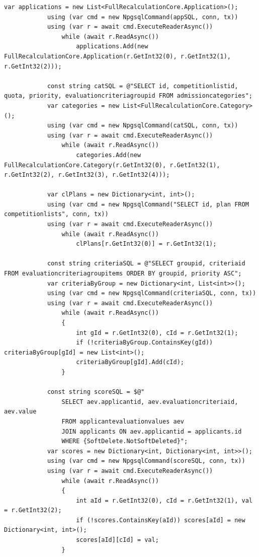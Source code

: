 \begin{lstlisting}[style=csharpstyle]
            var applications = new List<FullRecalculationCore.Application>();
            using (var cmd = new NpgsqlCommand(appSQL, conn, tx))
            using (var r = await cmd.ExecuteReaderAsync())
                while (await r.ReadAsync())
                    applications.Add(new FullRecalculationCore.Application(r.GetInt32(0), r.GetInt32(1), r.GetInt32(2)));

            const string catSQL = @"SELECT id, competitionlistid, quota, priority, evaluationcriteriagroupid FROM admissioncategories";
            var categories = new List<FullRecalculationCore.Category>();
            using (var cmd = new NpgsqlCommand(catSQL, conn, tx))
            using (var r = await cmd.ExecuteReaderAsync())
                while (await r.ReadAsync())
                    categories.Add(new FullRecalculationCore.Category(r.GetInt32(0), r.GetInt32(1), r.GetInt32(2), r.GetInt32(3), r.GetInt32(4)));

            var clPlans = new Dictionary<int, int>();
            using (var cmd = new NpgsqlCommand("SELECT id, plan FROM competitionlists", conn, tx))
            using (var r = await cmd.ExecuteReaderAsync())
                while (await r.ReadAsync())
                    clPlans[r.GetInt32(0)] = r.GetInt32(1);

            const string criteriaSQL = @"SELECT groupid, criteriaid FROM evaluationcriteriagroupitems ORDER BY groupid, priority ASC";
            var criteriaByGroup = new Dictionary<int, List<int>>();
            using (var cmd = new NpgsqlCommand(criteriaSQL, conn, tx))
            using (var r = await cmd.ExecuteReaderAsync())
                while (await r.ReadAsync())
                {
                    int gId = r.GetInt32(0), cId = r.GetInt32(1);
                    if (!criteriaByGroup.ContainsKey(gId)) criteriaByGroup[gId] = new List<int>();
                    criteriaByGroup[gId].Add(cId);
                }

            const string scoreSQL = $@"
                SELECT aev.applicantid, aev.evaluationcriteriaid, aev.value
                FROM applicantevaluationvalues aev
                JOIN applicants ON aev.applicantid = applicants.id
                WHERE {SoftDelete.NotSoftDeleted}";
            var scores = new Dictionary<int, Dictionary<int, int>>();
            using (var cmd = new NpgsqlCommand(scoreSQL, conn, tx))
            using (var r = await cmd.ExecuteReaderAsync())
                while (await r.ReadAsync())
                {
                    int aId = r.GetInt32(0), cId = r.GetInt32(1), val = r.GetInt32(2);
                    if (!scores.ContainsKey(aId)) scores[aId] = new Dictionary<int, int>();
                    scores[aId][cId] = val;
                }


\end{lstlisting}

